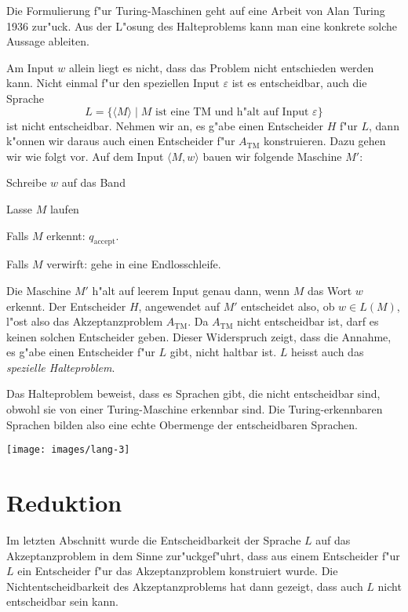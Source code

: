 Die Formulierung f"ur Turing-Maschinen geht auf eine Arbeit von
Alan Turing 1936 zur"uck.
Aus der L"osung des Halteproblems kann
man eine konkrete solche Aussage ableiten.

Am Input $w$ allein liegt es nicht, dass das Problem nicht
entschieden werden kann.
Nicht einmal f"ur den speziellen Input $\varepsilon$ ist es
entscheidbar, auch die Sprache
\[
L=\{
\langle M\rangle \;|\;
\text{$M$ ist eine TM und h"alt auf Input $\varepsilon$}
\}
\]
ist nicht entscheidbar. Nehmen wir an, es g"abe einen
Entscheider $H$ f"ur $L$, dann k"onnen wir daraus
auch einen Entscheider f"ur $A_{\text{TM}}$ konstruieren.
Dazu gehen wir wie folgt vor. Auf dem Input $\langle M,w\rangle$
bauen wir folgende Maschine $M'$:
\medskip
\begin{compactenum}
\item Schreibe $w$ auf das Band
\item Lasse $M$ laufen
\item Falls $M$ erkennt: $q_{\text{accept}}$.
\item Falls $M$ verwirft: gehe in eine Endlosschleife.
\end{compactenum}
\medskip
Die Maschine $M'$ h"alt auf leerem Input genau dann, wenn $M$
das Wort $w$ erkennt. Der Entscheider $H$, angewendet auf $M'$
entscheidet also, ob $w\in L(M)$, l"ost also das Akzeptanzproblem
$A_{\text{TM}}$. 
Da $A_{\text{TM}}$ nicht entscheidbar ist, darf es keinen solchen
Entscheider geben. Dieser Widerspruch zeigt, dass die Annahme, es
g"abe einen Entscheider f"ur $L$ gibt, nicht haltbar ist. $L$ heisst
auch das {\em spezielle Halteproblem}.

Das Halteproblem beweist, dass es Sprachen gibt, die nicht
entscheidbar sind, obwohl sie von einer Turing-Maschine
erkennbar sind. Die Turing-erkennbaren Sprachen bilden also eine
echte Obermenge der entscheidbaren Sprachen.
\begin{center}
\texttt{[image: images/lang-3]}
\end{center}

\section{Reduktion}
Im letzten Abschnitt wurde die Entscheidbarkeit der Sprache $L$
auf das Akzeptanzproblem in dem Sinne zur"uckgef"uhrt, dass
aus einem Entscheider f"ur $L$ ein Entscheider f"ur das Akzeptanzproblem
konstruiert wurde. Die Nichtentscheidbarkeit des Akzeptanzproblems
hat dann gezeigt, dass auch $L$ nicht entscheidbar sein kann.

